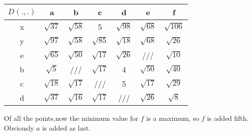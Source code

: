\documentclass[11pt,a4paper]{article}
\begin{document}
\begin{table}[H]
\centering
\def\arraystretch{1.2}
\begin{tabular}{|c|c|c|c|c|c|c|}
\hline 
$D(.,.)$ & a & b & c & d & e & f \\ 
\hline 
x & $\sqrt{37}$ & $\sqrt{58}$ & 5 & $\sqrt{98}$ & $\sqrt{68}$ & $\sqrt{106}$ \\ 
\hline 
y & $\sqrt{97}$ & $\sqrt{58}$ & $\sqrt{85}$ & $\sqrt{18}$ & $\sqrt{68}$ & $\sqrt{26}$ \\ 
\hline
e & $\sqrt{65}$ & $\sqrt{50}$ & $\sqrt{17}$ & $\sqrt{26}$ & /// & $\sqrt{10}$ \\
\hline
b & $\sqrt{5}$ & /// & $\sqrt{17}$ & 4 & $\sqrt{50}$ & $\sqrt{40}$ \\
\hline 
c & $\sqrt{18}$ & $\sqrt{17}$ & /// & 5 & $\sqrt{17}$ & $\sqrt{29}$ \\
\hline 
d & $\sqrt{37}$ & $\sqrt{16}$ & $\sqrt{17}$ & /// & $\sqrt{26}$ & $\sqrt{8}$ \\
\hline
\end{tabular} 
\end{table}
\noindent
Of all the points,now the minimum value for $f$ is a maximum, so $f$ is added fifth. Obviously $a$ is added as last.
\end{document}
